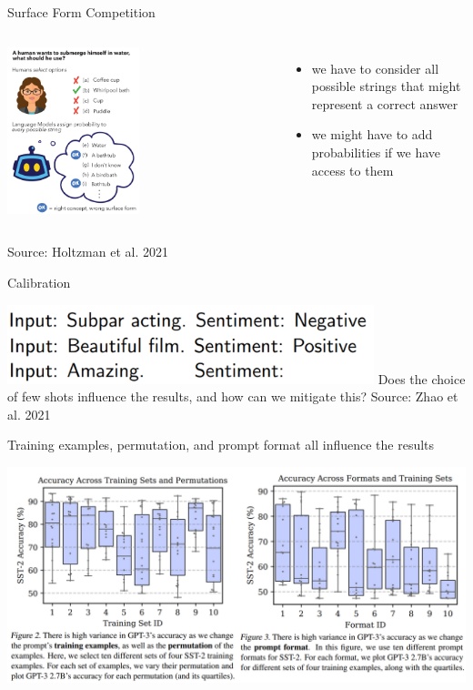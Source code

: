 \begin{vbframe}{Surface Form Competition}

	\begin{columns}

	\includegraphics[width=0.5\textwidth]{evaluation_figures/competition.png}

	\begin{itemize}
		\item we have to consider all possible strings that might represent a correct answer
		\item we might have to add probabilities if we have access to them
	\end{itemize}
	\end{columns}
	\tiny
	Source: Holtzman et al. 2021
\end{vbframe}	

\begin{vbframe}{Calibration}

	\includegraphics[width=0.8\textwidth]{evaluation_figures/calibration_sentiment.png}
	\vfill
	Does the choice of few shots influence the results, and how can we mitigate this?
	\tiny
	Source: Zhao et al. 2021
\end{vbframe}	

\begin{vbframe}{Training examples, permutation, and prompt format all influence the results}
	\vfill

	\includegraphics[width=\textwidth]{evaluation_figures/prompt_variation.png}
\end{vbframe}	

